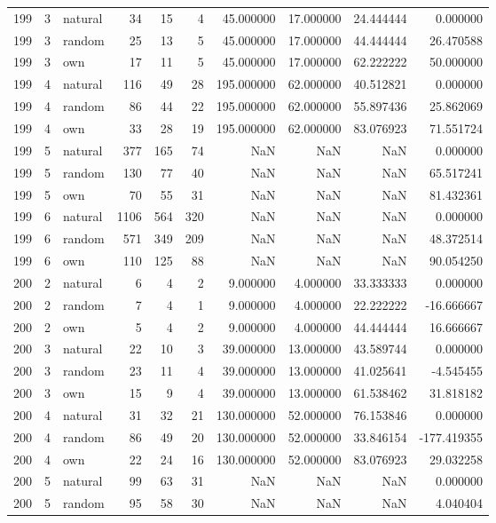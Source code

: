 \begin{table}[htbp]
\begin{tabular}{rrlrrrrrrr}
199 & 3 & natural & 34 & 15 & 4 & 45.000000 & 17.000000 & 24.444444 & 0.000000 \\
199 & 3 & random & 25 & 13 & 5 & 45.000000 & 17.000000 & 44.444444 & 26.470588 \\
199 & 3 & own & 17 & 11 & 5 & 45.000000 & 17.000000 & 62.222222 & 50.000000 \\
199 & 4 & natural & 116 & 49 & 28 & 195.000000 & 62.000000 & 40.512821 & 0.000000 \\
199 & 4 & random & 86 & 44 & 22 & 195.000000 & 62.000000 & 55.897436 & 25.862069 \\
199 & 4 & own & 33 & 28 & 19 & 195.000000 & 62.000000 & 83.076923 & 71.551724 \\
199 & 5 & natural & 377 & 165 & 74 & NaN & NaN & NaN & 0.000000 \\
199 & 5 & random & 130 & 77 & 40 & NaN & NaN & NaN & 65.517241 \\
199 & 5 & own & 70 & 55 & 31 & NaN & NaN & NaN & 81.432361 \\
199 & 6 & natural & 1106 & 564 & 320 & NaN & NaN & NaN & 0.000000 \\
199 & 6 & random & 571 & 349 & 209 & NaN & NaN & NaN & 48.372514 \\
199 & 6 & own & 110 & 125 & 88 & NaN & NaN & NaN & 90.054250 \\
200 & 2 & natural & 6 & 4 & 2 & 9.000000 & 4.000000 & 33.333333 & 0.000000 \\
200 & 2 & random & 7 & 4 & 1 & 9.000000 & 4.000000 & 22.222222 & -16.666667 \\
200 & 2 & own & 5 & 4 & 2 & 9.000000 & 4.000000 & 44.444444 & 16.666667 \\
200 & 3 & natural & 22 & 10 & 3 & 39.000000 & 13.000000 & 43.589744 & 0.000000 \\
200 & 3 & random & 23 & 11 & 4 & 39.000000 & 13.000000 & 41.025641 & -4.545455 \\
200 & 3 & own & 15 & 9 & 4 & 39.000000 & 13.000000 & 61.538462 & 31.818182 \\
200 & 4 & natural & 31 & 32 & 21 & 130.000000 & 52.000000 & 76.153846 & 0.000000 \\
200 & 4 & random & 86 & 49 & 20 & 130.000000 & 52.000000 & 33.846154 & -177.419355 \\
200 & 4 & own & 22 & 24 & 16 & 130.000000 & 52.000000 & 83.076923 & 29.032258 \\
200 & 5 & natural & 99 & 63 & 31 & NaN & NaN & NaN & 0.000000 \\
200 & 5 & random & 95 & 58 & 30 & NaN & NaN & NaN & 4.040404 \\

\end{tabular}
\end{table}
